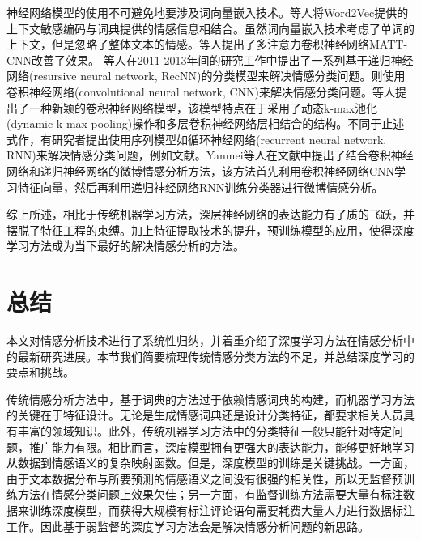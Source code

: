 \documentclass{clv3}
\begin{document}
神经网络模型的使用不可避免地要涉及词向量嵌入技术。\cite{giatsoglou}等人将Word2Vec提供的上下文敏感编码与词典提供的情感信息相结合。虽然词向量嵌入技术考虑了单词的上下文，但是忽略了整体文本的情感。\cite{liangbin}等人提出了多注意力卷积神经网络MATT-CNN改善了效果。
\cite{socher}等人在2011-2013年间的研究工作中提出了一系列基于递归神经网络(resursive neural network, RecNN)的分类模型来解决情感分类问题。\cite{kim}则使用卷积神经网络(convolutional neural network, CNN)来解决情感分类问题。\cite{kalchbrenner}等人提出了一种新颖的卷积神经网络模型，该模型特点在于采用了动态k-max池化(dynamic k-max pooling)操作和多层卷积神经网络层相结合的结构。不同于止述式作，有研究者提出使用序列模型如循环神经网络(recurrent neural network, RNN)来解决情感分类问题，例如文献\cite{sa-lstm}。Yanmei等人在文献\cite{rnn-cnn}中提出了结合卷积神经网络和递归神经网络的微博情感分析方法，该方法首先利用卷积神经网络CNN学习特征向量，然后再利用递归神经网络RNN训练分类器进行微博情感分析。

综上所述，相比于传统机器学习方法，深层神经网络的表达能力有了质的飞跃，并摆脱了特征工程的束缚。加上特征提取技术的提升，预训练模型的应用，使得深度学习方法成为当下最好的解决情感分析的方法。
\section{总结}
本文对情感分析技术进行了系统性归纳，并着重介绍了深度学习方法在情感分析中的最新研究进展。本节我们简要梳理传统情感分类方法的不足，并总结深度学习的要点和挑战。

传统情感分析方法中，基于词典的方法过于依赖情感词典的构建，而机器学习方法的关键在于特征设计。无论是生成情感词典还是设计分类特征，都要求相关人员具有丰富的领域知识。此外，传统机器学习方法中的分类特征一般只能针对特定问题，推广能力有限。相比而言，深度模型拥有更强大的表达能力，能够更好地学习从数据到情感语义的复杂映射函数。但是，深度模型的训练是关键挑战。一方面，由于文本数据分布与所要预测的情感语义之间没有很强的相关性，所以无监督预训练方法在情感分类问题上效果欠佳；另一方面，有监督训练方法需要大量有标注数据来训练深度模型，而获得大规模有标注评论语句需要耗费大量人力进行数据标注工作。因此基于弱监督的深度学习方法会是解决情感分析问题的新思路。
\starttwocolumn

\end{document}
